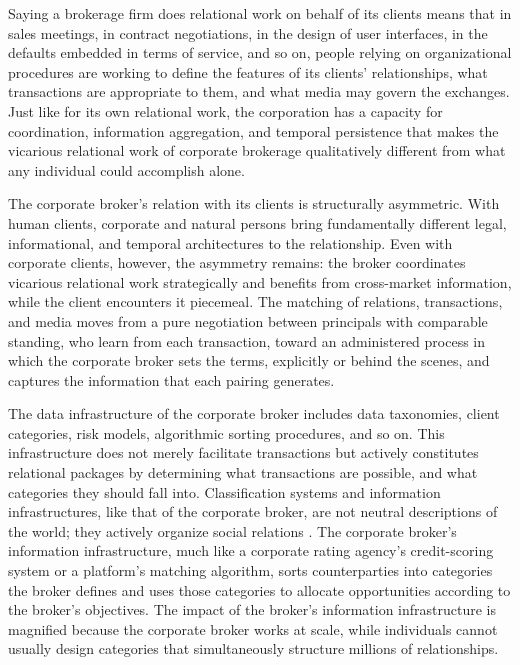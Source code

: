 \documentclass[
]{article}
\begin{document}
Saying a brokerage firm does relational work on behalf of its clients means that in sales meetings, in contract negotiations, in the design of user interfaces, in the defaults embedded in terms of service, and so on, people relying on organizational procedures are working to define the features of its clients' relationships, what transactions are appropriate to them, and what media may govern the exchanges. Just like for its own relational work, the corporation has a capacity for coordination, information aggregation, and temporal persistence that makes the vicarious relational work of corporate brokerage qualitatively different from what any individual could accomplish alone.

The corporate broker's relation with its clients is structurally asymmetric. With human clients, corporate and natural persons bring fundamentally different legal, informational, and temporal architectures to the relationship. Even with corporate clients, however, the asymmetry remains: the broker coordinates vicarious relational work strategically and benefits from cross-market information, while the client encounters it piecemeal. The matching of relations, transactions, and media moves from a pure negotiation between principals with comparable standing, who learn from each transaction, toward an administered process in which the corporate broker sets the terms, explicitly or behind the scenes, and captures the information that each pairing generates.

The data infrastructure of the corporate broker includes data taxonomies, client categories, risk models, algorithmic sorting procedures, and so on. This infrastructure does not merely facilitate transactions but actively constitutes relational packages by determining what transactions are possible, and what categories they should fall into. Classification systems and information infrastructures, like that of the corporate broker, are not neutral descriptions of the world; they actively organize social relations \autocite{fourcadeOrdinalSociety2024,geoffreyc.bowkerSortingThingsOut1999}. The corporate broker's information infrastructure, much like a corporate rating agency's credit-scoring system or a platform's matching algorithm, sorts counterparties into categories the broker defines and uses those categories to allocate opportunities according to the broker's objectives. The impact of the broker's information infrastructure is magnified because the corporate broker works at scale, while individuals cannot usually design categories that simultaneously structure millions of relationships.
\end{document}
